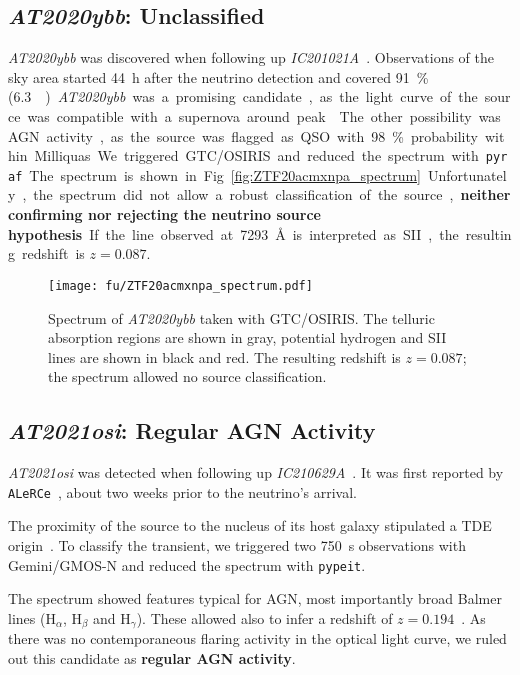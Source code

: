 \subsection{\emph{AT2020ybb}: Unclassified}
\emph{AT2020ybb} was discovered when following up \emph{IC201021A}~. Observations of the sky area started \SI{44}{\hour} after the neutrino detection and covered \SI{91}{\percent} (\SI{6.3}{\square\deg}).

\emph{AT2020ybb} was a promising candidate, as the light curve of the source was compatible with a supernova around peak~. The other possibility was AGN activity, as the source was flagged as QSO with \SI{98}{\percent} probability within Milliquas.

We triggered GTC/OSIRIS and reduced the spectrum with \texttt{pyraf}. The spectrum is shown in Fig.~\ref{fig:ZTF20acmxnpa_spectrum}. Unfortunately, the spectrum did not allow a robust classification of the source, \textbf{neither confirming nor rejecting the neutrino source hypothesis}. If the line observed at \SI{7293}{\angstrom} is interpreted as SII, the resulting redshift is $z=0.087$.

\begin{figure}[htb]
    \texttt{[image: fu/ZTF20acmxnpa\_spectrum.pdf]}
    \caption[\emph{AT2020ybb} spectrum]{Spectrum of \emph{AT2020ybb} taken with GTC/OSIRIS. The telluric absorption regions are shown in gray, potential hydrogen and SII lines are shown in black and red. The resulting redshift is $z=0.087$; the spectrum allowed no source classification.}
\end{figure}

\subsection{\emph{AT2021osi}: Regular AGN Activity}
\emph{AT2021osi} was detected when following up \emph{IC210629A}~. It was first reported by \texttt{ALeRCe}~, about two weeks prior to the neutrino's arrival.

The proximity of the source to the nucleus of its host galaxy stipulated a TDE origin~. To classify the transient, we triggered two \SI{750}{\second} observations with Gemini/GMOS-N and reduced the spectrum with \texttt{pypeit}.

The spectrum showed features typical for AGN, most importantly broad Balmer lines ($\text{H}_\alpha$, $\text{H}_\beta$ and $\text{H}_\gamma$). These allowed also to infer a redshift of $z=0.194$~. As there was no contemporaneous flaring activity in the optical light curve, we ruled out this candidate as \textbf{regular AGN activity}.

